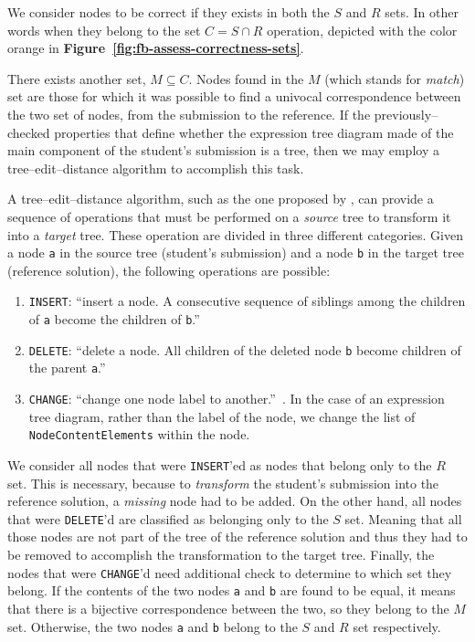 \begin{chapterBody}
We consider nodes to be correct if they exists in both the $ S $ and $ R $
sets. In other words when they belong to the set $ C = S \cap R $ operation,
depicted with the color orange in
\textbf{Figure~\ref{fig:fb-assess-correctness-sets}}. 

There exists another set, $ M \subseteq C $. Nodes found in the $ M $
(which stands for \textit{match}) set are those for which it was possible to
find a univocal correspondence between the two set of nodes, from the submission
to the reference.
If the previously–checked properties that define whether the expression tree
diagram made of the main component of the student's submission is a tree, then
we may employ a tree–edit–distance algorithm to accomplish this task.

A tree–edit–distance algorithm, such as the one proposed by 
\citet{zhang_simple_1989}, can provide a sequence of operations that must
be performed on a \textit{source} tree to transform it into a \textit{target}
tree. These operation are divided in three different categories. Given
a node \texttt{a} in the source tree (student's submission) and a node
\texttt{b} in the target tree (reference solution), the following operations
are possible:

\begin{enumerate}
    \item \texttt{INSERT}: ``insert a node. A consecutive sequence of siblings
among the children of \texttt{a} become the children of 
\texttt{b}.''~\cite{zhang_simple_1989}
    \item \texttt{DELETE}: ``delete a node. All children of the deleted node
\texttt{b} become children of the parent \texttt{a}.''~\cite{zhang_simple_1989}
    \item \texttt{CHANGE}: ``change one node label to 
another.''~\cite{zhang_simple_1989}. In the case of an expression tree
diagram, rather
than the label of the node, we change the list of \texttt{NodeContentElements}
within the node.
\end{enumerate}

We consider all nodes that were \texttt{INSERT}'ed as nodes that belong only
to the $ R $ set. This is necessary, because to \textit{transform} the
student's submission into the reference solution, a \textit{missing} node had
to be added.
On the other hand, all nodes that were \texttt{DELETE}'d are classified as
belonging only to the $ S $ set. Meaning that all those nodes are not part of 
the tree of the reference solution and thus they had to be removed to 
accomplish the transformation to the target tree.
Finally, the nodes that were \texttt{CHANGE}'d need additional check
to determine to which set they belong. If the contents of the two nodes
\texttt{a} and \texttt{b} are found to be equal, it means that there is
a bijective correspondence between the two, so they belong to the
$ M $ set. Otherwise, the two nodes \texttt{a} and \texttt{b} belong to the
$ S $ and $ R $ set respectively.


\end{chapterBody}
